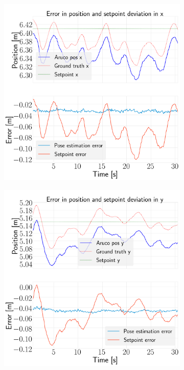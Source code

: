 \documentclass[../Head/report.tex]{subfiles}
\begin{document}
\begin{figure}[H]
    \centering
    \begin{subfigure}[t]{.30\textwidth}
        \centering
        \includegraphics[width=\textwidth]{../Figures/optitrack/hold_pose_using_estimated_aruco_pose/pose_error_x_test5.png}
        \caption{}
        \label{fig:optitrack_hold_pose_using_estimated_aruco_pose_error_x_test_five}
    \end{subfigure}
     \hspace{0.2em}
    \begin{subfigure}[t]{.30\textwidth}
        \centering
        \includegraphics[width=\textwidth]{../Figures/optitrack/hold_pose_using_estimated_aruco_pose/pose_error_y_test5.png}

\end{subfigure}
\end{figure}
\end{document}
